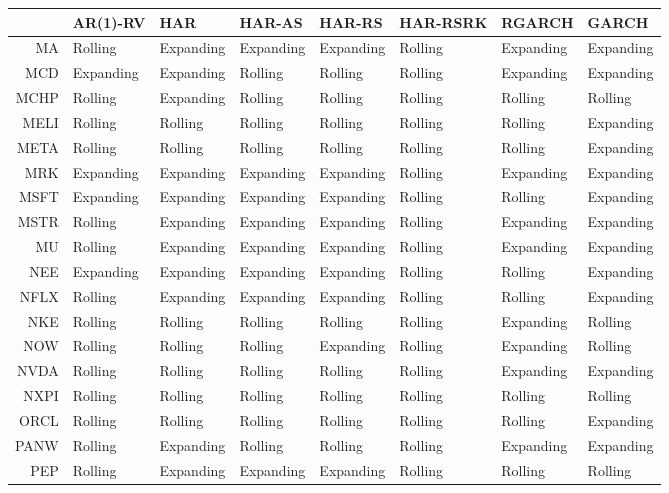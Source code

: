 \begin{table}[ht]
\centering
\begin{tabular}{rlllllll}
  \hline
 & AR(1)-RV & HAR & HAR-AS & HAR-RS & HAR-RSRK & RGARCH & GARCH \\ 
  \hline
MA & Rolling & Expanding & Expanding & Expanding & Rolling & Expanding & Expanding \\ 
  MCD & Expanding & Expanding & Rolling & Rolling & Rolling & Expanding & Expanding \\ 
  MCHP & Rolling & Expanding & Rolling & Rolling & Rolling & Rolling & Rolling \\ 
  MELI & Rolling & Rolling & Rolling & Rolling & Rolling & Rolling & Expanding \\ 
  META & Rolling & Rolling & Rolling & Rolling & Rolling & Rolling & Expanding \\ 
  MRK & Expanding & Expanding & Expanding & Expanding & Rolling & Expanding & Expanding \\ 
  MSFT & Expanding & Expanding & Expanding & Expanding & Rolling & Rolling & Expanding \\ 
  MSTR & Rolling & Expanding & Expanding & Expanding & Rolling & Expanding & Expanding \\ 
  MU & Rolling & Expanding & Expanding & Expanding & Rolling & Expanding & Expanding \\ 
  NEE & Expanding & Expanding & Expanding & Expanding & Rolling & Rolling & Expanding \\ 
  NFLX & Rolling & Expanding & Expanding & Expanding & Rolling & Rolling & Expanding \\ 
  NKE & Rolling & Rolling & Rolling & Rolling & Rolling & Expanding & Rolling \\ 
  NOW & Rolling & Rolling & Rolling & Expanding & Rolling & Expanding & Rolling \\ 
  NVDA & Rolling & Rolling & Rolling & Rolling & Rolling & Expanding & Expanding \\ 
  NXPI & Rolling & Rolling & Rolling & Rolling & Rolling & Rolling & Rolling \\ 
  ORCL & Rolling & Rolling & Rolling & Rolling & Rolling & Rolling & Expanding \\ 
  PANW & Rolling & Expanding & Rolling & Rolling & Rolling & Expanding & Expanding \\ 
  PEP & Rolling & Expanding & Expanding & Expanding & Rolling & Rolling & Rolling \\ 

\end{tabular}
\end{table}
